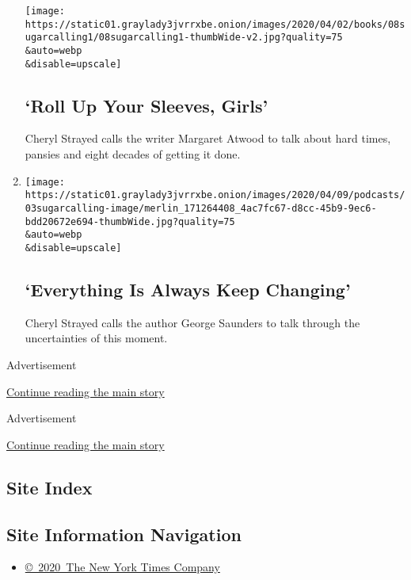 \begin{enumerate}
  \texttt{[image: https://static01.graylady3jvrrxbe.onion/images/2020/04/02/books/08sugarcalling1/08sugarcalling1-thumbWide-v2.jpg?quality=75\\\&auto=webp\\\&disable=upscale]}

  \hypertarget{roll-up-your-sleeves-girls}{%
  \subsection{`Roll Up Your Sleeves,
  Girls'}\label{roll-up-your-sleeves-girls}}

  Cheryl Strayed calls the writer Margaret Atwood to talk about hard
  times, pansies and eight decades of getting it done.
\item
  \href{/2020/04/03/podcasts/sugar-calling-george-saunders-coronavirus.html}{}

  \texttt{[image: https://static01.graylady3jvrrxbe.onion/images/2020/04/09/podcasts/03sugarcalling-image/merlin\_171264408\_4ac7fc67-d8cc-45b9-9ec6-bdd20672e694-thumbWide.jpg?quality=75\\\&auto=webp\\\&disable=upscale]}

  \hypertarget{everything-is-always-keep-changing}{%
  \subsection{`Everything Is Always Keep
  Changing'}\label{everything-is-always-keep-changing}}

  Cheryl Strayed calls the author George Saunders to talk through the
  uncertainties of this moment.
\end{enumerate}

Advertisement

\protect\hyperlink{after-mid1}{Continue reading the main story}

Advertisement

\protect\hyperlink{after-mktg}{Continue reading the main story}

\hypertarget{site-index}{%
\subsection{Site Index}\label{site-index}}

\hypertarget{site-information-navigation}{%
\subsection{Site Information
Navigation}\label{site-information-navigation}}

\begin{itemize}
\tightlist
\item
  \href{https://help.nytimes3xbfgragh.onion/hc/en-us/articles/115014792127-Copyright-notice}{©~2020~The
  New York Times Company}
\end{itemize}

